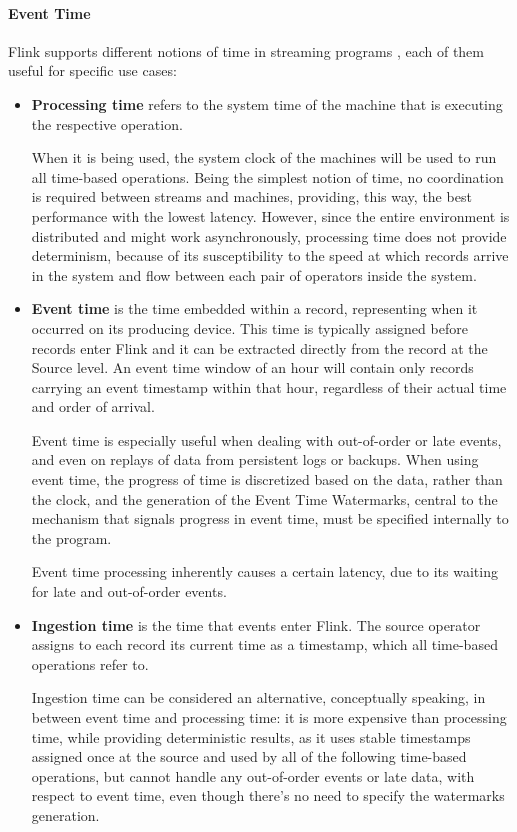 \paragraph{Event Time}

Flink supports different notions of time in streaming programs \cite{flink_eventtime}, each of them useful for specific use cases:

\begin{itemize}
    \item \textbf{Processing time} refers to the system time of the machine that is executing the respective operation.
    
    When it is being used, the system clock of the machines will be used to run all time-based operations. Being the simplest notion of time, no coordination is required between streams and machines, providing, this way, the best performance with the lowest latency. However, since the entire environment is distributed and might work asynchronously, processing time does not provide determinism, because of its susceptibility to the speed at which records arrive in the system and flow between each pair of operators inside the system.
    
    \item \textbf{Event time} is the time embedded within a record, representing when it occurred on its producing device. This time is typically assigned before records enter Flink and it can be extracted directly from the record at the Source level. An event time window of an hour will contain only records carrying an event timestamp within that hour, regardless of their actual time and order of arrival.
    
    Event time is especially useful when dealing with out-of-order or late events, and even on replays of data from persistent logs or backups. When using event time, the progress of time is discretized based on the data, rather than the clock, and the generation of the Event Time Watermarks, central to the mechanism that signals progress in event time,  must be specified internally to the program.
    
    Event time processing inherently causes a certain latency, due to its waiting for late and out-of-order events.
    
    \item \textbf{Ingestion time} is the time that events enter Flink. The source operator assigns to each record its current time as a timestamp, which all time-based operations refer to.
    
    Ingestion time can be considered an alternative, conceptually speaking, in between event time and processing time: it is more expensive than processing time, while providing deterministic results, as it uses stable timestamps assigned once at the source and used by all of the following time-based operations, but cannot handle any out-of-order events or late data, with respect to event time, even though there's no need to specify the watermarks generation.
\end{itemize}



